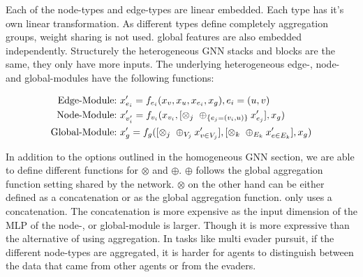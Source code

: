 Each of the node-types and edge-types are linear embedded. Each type has it's own linear transformation. As different types define completely aggregation groups, weight sharing is not used. global features are also embedded independently. Structurely the heterogeneous GNN stacks and blocks are the same, they only have more inputs. The underlying heterogeneous edge-, node- and global-modules have the following functions:

\begin{equation}
    \begin{aligned}
        \textup{Edge-Module:}\ & x'_{e_i} = f_{e_i}(x_v, x_u, x_{e_i}, x_g), e_i = (u, v)\\
        \textup{Node-Module:}\ & x'_{v'_i} = f_{v_i}(x_{v_i}, [\otimes_j\ \oplus_{\{e_j=(v_i,u)\}} x'_{e_j}], x_g)\\
        \textup{Global-Module:}\ & x'_{g} = f_g([\otimes_j\ \oplus_{V_j} x'_{v\in V_j}], [\otimes_k\ \oplus_{E_k} x'_{e\in E_k}], x_g)
    \end{aligned}
    \nonumber
\end{equation}

In addition to the options outlined in the homogeneous GNN section, we are able to define different functions for $\otimes$ and $\oplus$. $\oplus$ follows the global aggregation function setting shared by the network. $\otimes$ on the other hand can be either defined as a concatenation or as the global aggregation function.  only uses a concatenation. The concatenation is more expensive as the input dimension of the MLP of the node-, or global-module is larger. Though it is more expressive than the alternative of using aggregation. In tasks like multi evader pursuit, if the different node-types are aggregated, it is harder for agents to distinguish between the data that came from other agents or from the evaders.

